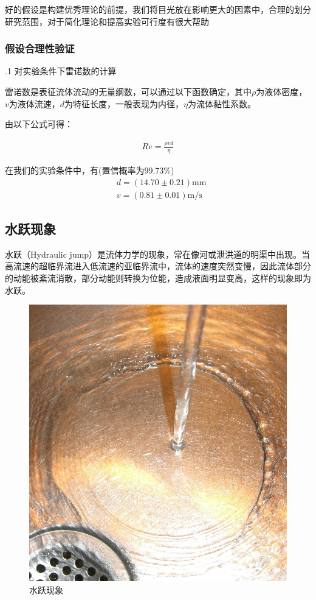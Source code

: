 \documentclass[UTF8]{gapd}
\begin{document}
好的假设是构建优秀理论的前提，我们将目光放在影响更大的因素中，合理的划分研究范围，对于简化理论和提高实验可行度有很大帮助
\subsubsection{假设合理性验证}

\noindent .1  对实验条件下雷诺数的计算

雷诺数是表征流体流动的无量纲数，可以通过以下函数确定，其中$\rho$为液体密度，$v$为液体流速，$d$为特征长度，一般表现为内径，$\eta$为流体黏性系数。

由以下公式可得：

\begin{align}
    Re=\frac{\rho vd}{\eta}
\end{align}

在我们的实验条件中，有(置信概率为99.73\%)
\begin{align}
    &d=(14.70 \pm 0.21)\text{mm}\\
    &v=(0.81 \pm 0.01)\text{m/s}
\end{align}
\subsection{水跃现象}
水跃（Hydraulic jump）是流体力学的现象，常在像河或泄洪道的明渠中出现。当高流速的超临界流进入低流速的亚临界流中，流体的速度突然变慢，因此流体部分的动能被紊流消散，部分动能则转换为位能，造成液面明显变高，这样的现象即为水跃。\cite{wiki:水跃}

\begin{figure}[!htbp]%
  \centering
  \includegraphics[width=0.8\columnwidth]{images/shock_sink.jpg}
  \caption{水跃现象\cite{wiki:水跃}}
  \label{fig:unsinkable_disc_hudraulia_jump}%
\end{figure}
\end{document}
